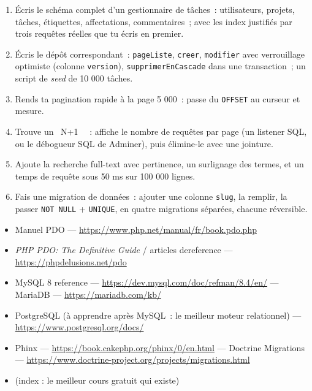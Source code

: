 \begin{exercice}
\begin{enumerate}
  \item \'Ecris le sch\'ema complet d'un gestionnaire de t\^aches~: utilisateurs, projets, t\^aches,
        \'etiquettes, affectations, commentaires~; avec les index justifi\'es par trois requ\^etes
        r\'eelles que tu \'ecris en premier.
  \item \'Ecris le d\'ep\^ot correspondant~: \verb|pageListe|, \verb|creer|, \verb|modifier| avec
        verrouillage optimiste (colonne \verb|version|), \verb|supprimerEnCascade| dans une
        transaction~; un script de \emph{seed} de 10 000 t\^aches.
  \item Rends ta pagination rapide \`a la page 5 000~: passe du \verb|OFFSET| au curseur et mesure.
  \item Trouve un \og ~N+1~ \fg{}~: affiche le nombre de requ\^etes par page (un listener SQL, ou le
        d\'ebogueur SQL de Adminer), puis \'elimine-le avec une jointure.
  \item Ajoute la recherche full-text avec pertinence, un surlignage des termes, et un temps
        de requ\^ete sous 50 ms sur 100 000 lignes.
  \item Fais une migration de donn\'ees~: ajouter une colonne \verb|slug|, la remplir, la passer
        \verb|NOT NULL| + \verb|UNIQUE|, en quatre migrations s\'epar\'ees, chacune r\'eversible.
\end{enumerate}
\end{exercice}

\begin{ressources}
\begin{itemize}
  \item Manuel PDO --- \url{https://www.php.net/manual/fr/book.pdo.php}
  \item \emph{PHP PDO: The Definitive Guide} / articles dereference --- \url{https://phpdelusions.net/pdo}
  \item MySQL 8 reference --- \url{https://dev.mysql.com/doc/refman/8.4/en/} --- MariaDB --- \url{https://mariadb.com/kb/}
  \item PostgreSQL (\`a apprendre apr\`es MySQL~: le meilleur moteur relationnel) --- \url{https://www.postgresql.org/docs/}
  \item Phinx --- \url{https://book.cakephp.org/phinx/0/en.html} --- Doctrine Migrations --- \url{https://www.doctrine-project.org/projects/migrations.html}
  \item {} (index : le meilleur cours gratuit qui existe)
\end{itemize}
\end{ressources}

